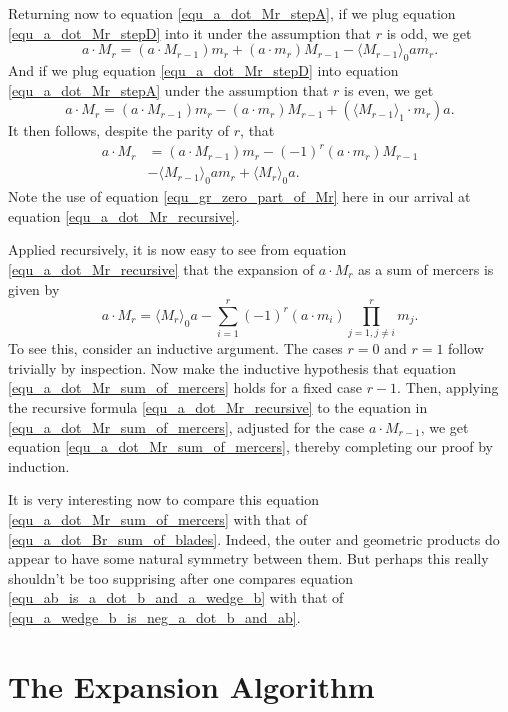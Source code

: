 \documentclass{birkjour}
\theoremstyle{definition}
\theoremstyle{remark}
\numberwithin{equation}{section}
\begin{document}
Returning now to equation \eqref{equ_a_dot_Mr_stepA}, if we plug equation \eqref{equ_a_dot_Mr_stepD} into it
under the assumption that $r$ is odd, we get
\begin{equation}
a\cdot M_r = (a\cdot M_{r-1})m_r + (a\cdot m_r)M_{r-1} - \langle M_{r-1}\rangle_0am_r.
\end{equation}
And if we plug equation \eqref{equ_a_dot_Mr_stepD} into equation \eqref{equ_a_dot_Mr_stepA} under the assumption
that $r$ is even, we get
\begin{equation}
a\cdot M_r = (a\cdot M_{r-1})m_r - (a\cdot m_r)M_{r-1} + (\langle M_{r-1}\rangle_1\cdot m_r)a.
\end{equation}
It then follows, despite the parity of $r$, that
\begin{align}
a\cdot M_r &= (a\cdot M_{r-1})m_r - (-1)^r(a\cdot m_r)M_{r-1}\nonumber \\
 &- \langle M_{r-1}\rangle_0am_r + \langle M_r\rangle_0a.\label{equ_a_dot_Mr_recursive}
\end{align}
Note the use of equation \eqref{equ_gr_zero_part_of_Mr} here in our arrival at equation \eqref{equ_a_dot_Mr_recursive}.

Applied recursively, it is now easy to see from equation \eqref{equ_a_dot_Mr_recursive} that the expansion of
$a\cdot M_r$ as a sum of mercers is given by
\begin{equation}\label{equ_a_dot_Mr_sum_of_mercers}
a\cdot M_r = \langle M_r\rangle_0a - \sum_{i=1}^r(-1)^r(a\cdot m_i)\prod_{j=1,j\neq i}^rm_j.
\end{equation}
To see this, consider an inductive argument.  The cases $r=0$ and $r=1$ follow trivially by inspection.
Now make the inductive hypothesis that equation \eqref{equ_a_dot_Mr_sum_of_mercers} holds for a fixed case $r-1$.
Then, applying the recursive formula \eqref{equ_a_dot_Mr_recursive} to the equation in \eqref{equ_a_dot_Mr_sum_of_mercers},
adjusted for the case $a\cdot M_{r-1}$, we get equation \eqref{equ_a_dot_Mr_sum_of_mercers}, thereby completing
our proof by induction.

It is very interesting now to compare this equation \eqref{equ_a_dot_Mr_sum_of_mercers} with that of \eqref{equ_a_dot_Br_sum_of_blades}.
Indeed, the outer and geometric products do appear to have some natural symmetry between them.  But perhaps this really shouldn't be
too supprising after one compares equation \eqref{equ_ab_is_a_dot_b_and_a_wedge_b} with that of \eqref{equ_a_wedge_b_is_neg_a_dot_b_and_ab}.

\section{The Expansion Algorithm}
\end{document}
